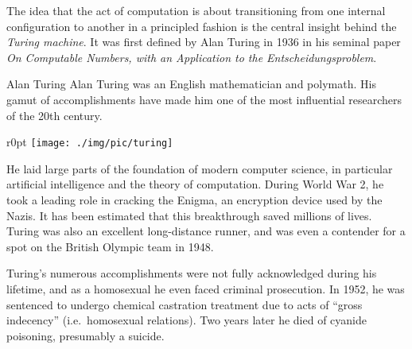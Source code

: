The idea that the act of computation is about transitioning from one internal configuration to another in a principled fashion is the central insight behind the \emph{Turing machine}.
It was first defined by Alan Turing in 1936 in his seminal paper \emph{On Computable Numbers, with an Application to the Entscheidungsproblem}.

\begin{person}[1912--1954]{Alan Turing}
Alan Turing was an English mathematician and polymath.
His gamut of accomplishments have made him one of the most influential researchers of the 20th century.
\begin{wrapfigure}{r}{0pt}
    \texttt{[image: ./img/pic/turing]}
\end{wrapfigure}
He laid large parts of the foundation of modern computer science, in particular artificial intelligence and the theory of computation.
During World War 2, he took a leading role in cracking the Enigma, an encryption device used by the Nazis.
It has been estimated that this breakthrough saved millions of lives.
Turing was also an excellent long-distance runner, and was even a contender for a spot on the British Olympic team in 1948.

Turing's numerous accomplishments were not fully acknowledged during his lifetime, and as a homosexual he even faced criminal prosecution.
In 1952, he was sentenced to undergo chemical castration treatment due to acts of ``gross indecency'' (i.e.~homosexual relations).
Two years later he died of cyanide poisoning, presumably a suicide.
\end{person}

